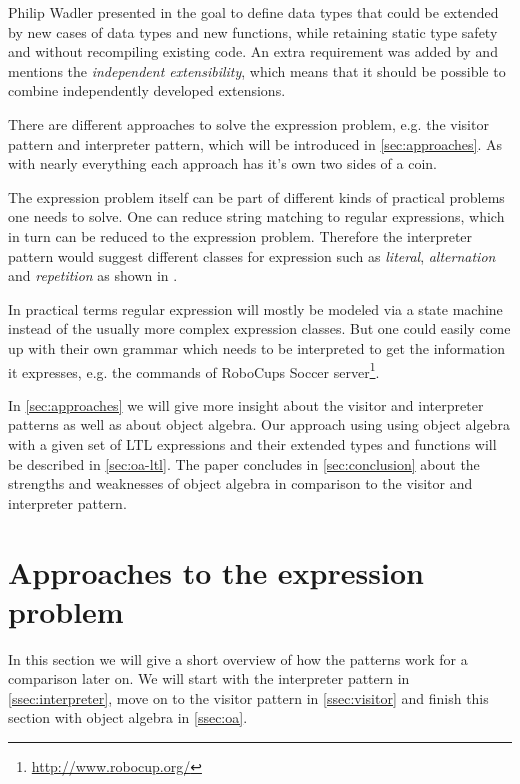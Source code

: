 \documentclass{llncs}
\begin{document}
Philip Wadler presented in \cite{wadler98} the goal to define data types that could be extended by new cases of data types and new functions, while retaining static type safety and without recompiling existing code. An extra requirement was added by \cite{Odersky05} and mentions the \emph{independent extensibility}, which means that it should be possible to combine independently developed extensions.

There are different approaches to solve the expression problem, e.g. the visitor pattern and interpreter pattern, which will be introduced in \autoref{sec:approaches}. As with nearly everything each approach has it's own two sides of a coin. 

The expression problem itself can be part of different kinds of practical problems one needs to solve. One can reduce string matching to regular expressions, which in turn can be reduced to the expression problem. Therefore the interpreter pattern would suggest different classes for expression such as \emph{literal}, \emph{alternation} and \emph{repetition} as shown in \cite{GHJV94}.

In practical terms regular expression will mostly be modeled via a state machine instead of the usually more complex expression classes. But one could easily come up with their own grammar which needs to be interpreted to get the information it expresses, e.g. the commands of RoboCups Soccer server\footnote{\href{http://www.robocup.org/}{http://www.robocup.org/}}.

In \autoref{sec:approaches} we will give more insight about the visitor and interpreter patterns as well as about object algebra. Our approach using using object algebra with a given set of LTL expressions and their extended types and functions will be described in \autoref{sec:oa-ltl}. The paper concludes in \autoref{sec:conclusion} about the strengths and weaknesses of object algebra in comparison to the visitor and interpreter pattern.

\section{Approaches to the expression problem} \label{sec:approaches}
In this section we will give a short overview of how the patterns work for a comparison later on. We will start with the interpreter pattern in \autoref{ssec:interpreter}, move on to the visitor pattern in \autoref{ssec:visitor} and finish this section with object algebra in \autoref{ssec:oa}.
\end{document}
